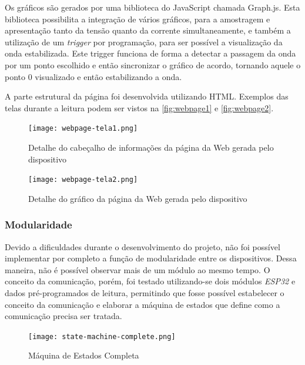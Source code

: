 
Os gráficos são gerados por uma biblioteca do JavaScript chamada Graph.js. Esta biblioteca possibilita a integração de vários gráficos, para a amostragem e apresentação tanto da tensão quanto da corrente simultaneamente, e também a utilização de um \textit{trigger} por programação, para ser possível a visualização da onda estabilizada. Este trigger funciona de forma a detectar a passagem da onda por um ponto escolhido e então sincronizar o gráfico de acordo, tornando aquele o ponto 0 visualizado e então estabilizando a onda.

A parte estrutural da página foi desenvolvida utilizando \gls{HTML}. Exemplos das telas durante a leitura podem ser vistos na \autoref{fig:webpage1} e \autoref{fig:webpage2}.

\begin{figure}[h!]
    \centering
    \caption{Detalhe do cabeçalho de informações da página da Web gerada pelo dispositivo}
    \texttt{[image: webpage-tela1.png]}
    \label{fig:webpage1}
    \fonte{}
\end{figure}

\begin{figure}[h!]
    \centering
    \caption{Detalhe do gráfico da página da Web gerada pelo dispositivo}
    \texttt{[image: webpage-tela2.png]}
    \label{fig:webpage2}
    \fonte{}
\end{figure}

\subsubsection{Modularidade}\label{modular-softw}

Devido a dificuldades durante o desenvolvimento do projeto, não foi possível implementar por completo a função de modularidade entre os dispositivos. Dessa maneira, não é possível observar mais de um módulo ao mesmo tempo.
O conceito da comunicação, porém, foi testado utilizando-se dois módulos \textit{ESP32} e dados pré-programados de leitura, permitindo que fosse possível estabelecer o conceito da comunicação e elaborar a máquina de estados que define como a comunicação precisa ser tratada.

\begin{figure}[h!]
    \centering
    \caption{Máquina de Estados Completa}
    \texttt{[image: state-machine-complete.png]}
    \label{fig:maq-estados-completa}
    \fonte{}
\end{figure}

